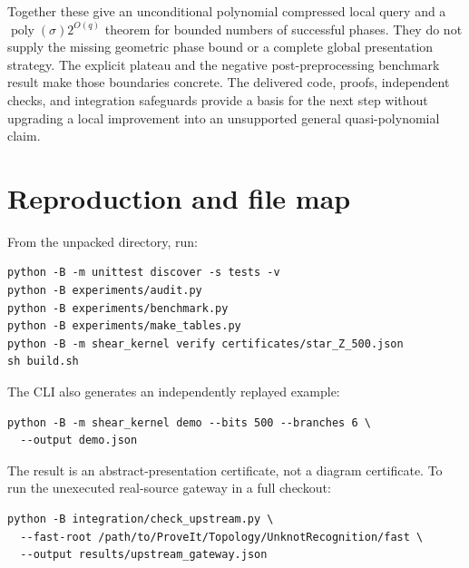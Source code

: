 \documentclass[11pt,letterpaper]{article}
\theoremstyle{definition}
\theoremstyle{remark}\newtheorem{remark}[theorem]{Remark}
\newcommand{\poly}{\operatorname{poly}}
\begin{document}
Together these give an unconditional polynomial compressed local query and
a $\poly(\sigma)2^{O(q)}$ theorem for bounded numbers of successful phases.
They do not supply the missing geometric phase bound or a complete global
presentation strategy. The explicit plateau and the negative post-preprocessing
benchmark result make those boundaries concrete. The delivered code, proofs,
independent checks, and integration safeguards provide a basis for the next
step without upgrading a local improvement into an unsupported general
quasi-polynomial claim.

\appendix
\section{Reproduction and file map}
\label{app:files}

From the unpacked directory, run:
\begin{verbatim}
python -B -m unittest discover -s tests -v
python -B experiments/audit.py
python -B experiments/benchmark.py
python -B experiments/make_tables.py
python -B -m shear_kernel verify certificates/star_Z_500.json
sh build.sh
\end{verbatim}

The CLI also generates an independently replayed example:
\begin{verbatim}
python -B -m shear_kernel demo --bits 500 --branches 6 \
  --output demo.json
\end{verbatim}
The result is an abstract-presentation certificate, not a diagram certificate.
To run the unexecuted real-source gateway in a full checkout:
\begin{verbatim}
python -B integration/check_upstream.py \
  --fast-root /path/to/ProveIt/Topology/UnknotRecognition/fast \
  --output results/upstream_gateway.json
\end{verbatim}
\end{document}
